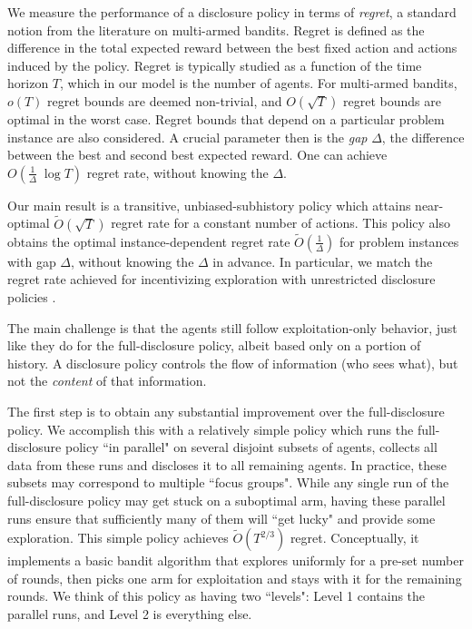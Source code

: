 We measure the performance of a disclosure policy in terms of \emph{regret}, a standard notion from the literature on multi-armed bandits. Regret is defined as the difference in the total expected reward between the best fixed action and actions induced by the policy. Regret is typically studied as a function of the time horizon $T$, which in our model is the number of agents. For multi-armed bandits, $o(T)$ regret bounds are deemed non-trivial, and $O(\sqrt{T})$ regret bounds are optimal in the worst case. Regret bounds that depend on a particular problem instance are also considered. A crucial parameter then is the \emph{gap} $\Delta$, the difference between the best and second best expected reward. One can achieve $O(\tfrac{1}{\Delta}\; \log T)$ regret rate, without knowing the $\Delta$.

Our main result is a transitive, unbiased-subhistory policy which attains near-optimal $\tilde{O}(\sqrt{T})$ regret rate for a constant number of actions. This policy also obtains the optimal instance-dependent regret rate
    $\tilde{O}(\tfrac{1}{\Delta})$
for problem instances with gap $\Delta$, without knowing the $\Delta$ in advance. In particular, we match the regret rate achieved for incentivizing exploration with unrestricted disclosure policies \cite{ICexploration-ec15-working}.

The main challenge is that the agents still follow exploitation-only behavior, just like they do for the full-disclosure policy, albeit based only on a portion of history. A disclosure policy controls the flow of information (who sees what), but not the \emph{content} of that information.

The first step is to obtain any substantial improvement over the full-disclosure policy. We accomplish this with a relatively simple policy which runs the full-disclosure policy ``in parallel" on several disjoint subsets of agents,  collects all data from these runs and discloses it to all remaining agents. In practice, these subsets may correspond to multiple ``focus groups". While any single run of the full-disclosure policy may get stuck on a suboptimal arm, having these parallel runs ensure that sufficiently many of them will ``get lucky" and provide some exploration. This simple policy achieves $\tilde{O}(T^{2/3})$ regret. Conceptually, it implements a basic bandit algorithm that explores uniformly for a pre-set number of rounds, then picks one arm for exploitation and stays with it for the remaining rounds. We think of this policy  as having two ``levels": Level 1 contains the parallel runs, and Level 2 is everything else.


